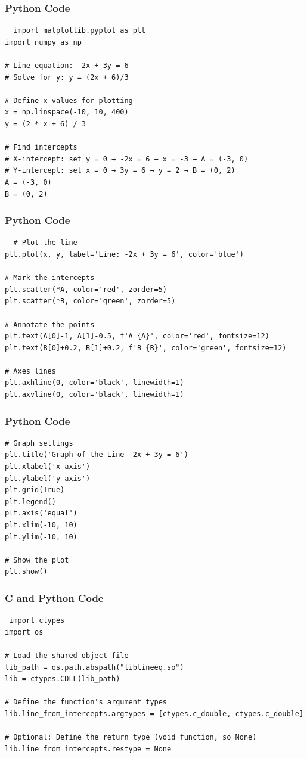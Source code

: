 \documentclass{beamer}
\begin{document}
\begin{frame}[fragile]
\frametitle{Python Code}
\begin{lstlisting}
  import matplotlib.pyplot as plt
import numpy as np

# Line equation: -2x + 3y = 6
# Solve for y: y = (2x + 6)/3

# Define x values for plotting
x = np.linspace(-10, 10, 400)
y = (2 * x + 6) / 3

# Find intercepts
# X-intercept: set y = 0 → -2x = 6 → x = -3 → A = (-3, 0)
# Y-intercept: set x = 0 → 3y = 6 → y = 2 → B = (0, 2)
A = (-3, 0)
B = (0, 2)
\end{lstlisting}
\end{frame}

\begin{frame}[fragile]
\frametitle{Python Code}
\begin{lstlisting}
  # Plot the line
plt.plot(x, y, label='Line: -2x + 3y = 6', color='blue')

# Mark the intercepts
plt.scatter(*A, color='red', zorder=5)
plt.scatter(*B, color='green', zorder=5)

# Annotate the points
plt.text(A[0]-1, A[1]-0.5, f'A {A}', color='red', fontsize=12)
plt.text(B[0]+0.2, B[1]+0.2, f'B {B}', color='green', fontsize=12)

# Axes lines
plt.axhline(0, color='black', linewidth=1)
plt.axvline(0, color='black', linewidth=1)

\end{lstlisting}
\end{frame}
\begin{frame}[fragile]
    \frametitle{Python Code}
    \begin{lstlisting}
# Graph settings
plt.title('Graph of the Line -2x + 3y = 6')
plt.xlabel('x-axis')
plt.ylabel('y-axis')
plt.grid(True)
plt.legend()
plt.axis('equal')
plt.xlim(-10, 10)
plt.ylim(-10, 10)

# Show the plot
plt.show()

\end{lstlisting}
\end{frame}
\begin{frame}[fragile]
\frametitle{C and Python Code}
\begin{lstlisting}
 import ctypes
import os

# Load the shared object file
lib_path = os.path.abspath("liblineeq.so")
lib = ctypes.CDLL(lib_path)

# Define the function's argument types
lib.line_from_intercepts.argtypes = [ctypes.c_double, ctypes.c_double]

# Optional: Define the return type (void function, so None)
lib.line_from_intercepts.restype = None

\end{lstlisting}
\end{frame}
\end{document}
